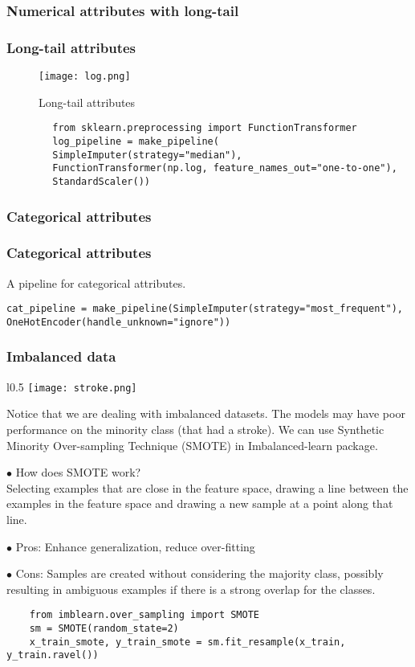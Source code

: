 \documentclass[10pt]{beamer}
\theoremstyle{definition}
\theoremstyle{remark}
\numberwithin{equation}{section}
\begin{document}
\subsubsection{Numerical attributes with long-tail}
\begin{frame}[fragile]
	\frametitle{Long-tail attributes}
	\begin{figure}[h]
		\caption{Long-tail attributes}
		\texttt{[image: log.png]}
	\end{figure}
	\begin{lstlisting}
		from sklearn.preprocessing import FunctionTransformer
		log_pipeline = make_pipeline(
		SimpleImputer(strategy="median"),
		FunctionTransformer(np.log, feature_names_out="one-to-one"),
		StandardScaler())		
	\end{lstlisting}
\end{frame}

\subsubsection{Categorical attributes}
\begin{frame}[fragile]
	\frametitle{Categorical attributes}
A pipeline for categorical attributes.
\begin{lstlisting}
cat_pipeline = make_pipeline(SimpleImputer(strategy="most_frequent"), OneHotEncoder(handle_unknown="ignore"))
\end{lstlisting}
\end{frame}






\begin{frame}
	\frametitle{Imbalanced data}
	\begin{wrapfigure}{l}{0.5\textwidth}
		\texttt{[image: stroke.png]}
	\end{wrapfigure}
	
Notice that we are dealing with imbalanced datasets. The models may have poor performance on the minority class (that had a stroke). We can use Synthetic Minority Over-sampling Technique (SMOTE) in Imbalanced-learn package.
\end{frame}


\begin{frame}[fragile]
	
$\bullet$ How does SMOTE work?\\

Selecting examples that are close in the feature space, drawing a line between the examples in the feature space and drawing a new sample at a point along that line. 

$\bullet$ Pros: Enhance generalization, reduce over-fitting

$\bullet$ Cons: Samples are created without considering the majority class, possibly resulting in ambiguous examples if there is a strong overlap for the classes.
\begin{lstlisting}
	from imblearn.over_sampling import SMOTE
	sm = SMOTE(random_state=2)
	x_train_smote, y_train_smote = sm.fit_resample(x_train, y_train.ravel())
\end{lstlisting}

\end{frame}
\end{document}
